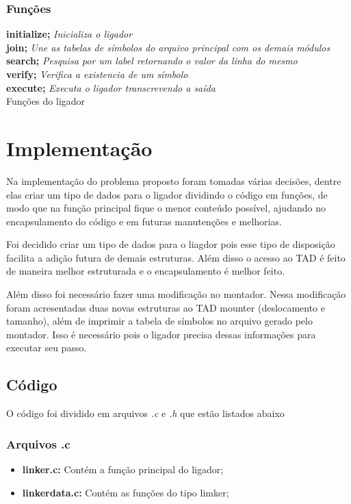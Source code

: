 \documentclass[12pt]{article}
\begin{document}
\subsubsection{Funções}
\begin{algorithm}[h!]
\begin{footnotesize}
   \textbf{initialize;} \textit{Inicializa o ligador} \\
   \textbf{join;} \textit{Une as tabelas de símbolos do arquivo principal com
   os demais módulos}
   \\
   \textbf{search;} \textit{Pesquisa por um label retornando o valor da linha
   do mesmo}
   \\
   \textbf{verify;} \textit{Verifica a existencia de um símbolo}
   \\
   \textbf{execute;} \textit{Executa o ligador transcrevendo a saída} \\
\caption{Funções do ligador}
\end{footnotesize}
\end{algorithm}


\section{Implementação}
\label{implementacao}
Na implementação do problema proposto foram tomadas várias decisões, dentre
elas criar um tipo de dados para o ligador dividindo o código em funções,
de modo que na função principal fique o menor conteúdo possível, ajudando no
encapsulamento do código e em futuras manutenções e melhorias.

Foi decidido criar um tipo de dados para o liagdor pois esse tipo de
disposição facilita a adição futura de demais estruturas.
Além disso o acesso ao TAD é feito de maneira melhor estruturada e o
encapsulamento é melhor feito.

Além disso foi necessário fazer uma modificação no montador. Nessa modificação
foram acresentadas duas novas estruturas ao TAD mounter (deslocamento e
tamanho), além de imprimir a tabela de símbolos no arquivo gerado pelo montador.
Isso é necessário pois o ligador precisa dessas informações para executar seu
passo.

\subsection{Código}
O código foi dividido em arquivos \textit{.c} e \textit{.h} que estão listados
abaixo

\subsubsection{Arquivos .c}
\begin{itemize}
\item \textbf{linker.c:} Contém a função principal do ligador;
\item \textbf{linkerdata.c:} Contém as funções do tipo limker;
\end{itemize}
\end{document}
